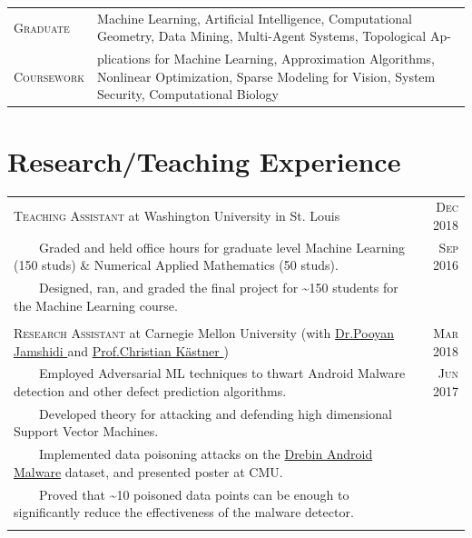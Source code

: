 \documentclass{article}
\newcommand{\tabitem}{~~\llap{\textbullet}~~}
\newcommand{\custombold}[1]{\color{subheadings}\fontspec[Path = fonts/lato/]{Lato-Reg}\selectfont #1 \normalfont}
\begin{document}
\begin{tabularx}{\textwidth}{lX}
\textsc{Graduate} & Machine Learning, Artificial Intelligence, Computational Geometry, Data Mining, Multi-Agent Systems, Topological Ap-\\
\textsc{Coursework} & plications for Machine Learning, Approximation Algorithms, Nonlinear Optimization, Sparse Modeling for Vision, System Security, Computational Biology
\end{tabularx}
\fi

\vspace{12pt}\section{Research/Teaching Experience}
\begin{tabularx}{\textwidth}{X|r}

\large{\textsc{Teaching Assistant} at \custombold{Washington University in St. Louis}} & \textsc{Dec} 2018\\
\tabitem Graded and held office hours for graduate level Machine Learning (150 studs) \& Numerical Applied Mathematics (50 studs). & \textsc{Sep} 2016\\
\tabitem Designed, ran, and graded the final project for \textasciitilde 150 students for the Machine Learning course.\\
\multicolumn{2}{c}{\vspace{-5pt}} \\

\large{\textsc{Research Assistant} at \custombold{Carnegie Mellon University}} \normalsize{(with \href{https://www.cs.cmu.edu/~pjamshid/}{Dr.\custombold{Pooyan Jamshidi}} and \href{https://www.cs.cmu.edu/~ckaestne/}{Prof.\custombold{Christian Kästner}})}& \textsc{Mar} 2018\\
\tabitem Employed Adversarial ML techniques to thwart Android Malware detection and other defect prediction algorithms. & \textsc{Jun} 2017\\
\tabitem Developed theory for attacking and defending high dimensional Support Vector Machines.\\
\tabitem Implemented data poisoning attacks on the \href{https://www.sec.cs.tu-bs.de/~danarp/drebin/}{Drebin Android Malware} dataset, and presented poster at CMU. \\
\tabitem Proved that \textasciitilde 10 poisoned data points can be enough to significantly reduce the effectiveness of the malware detector.\\
\multicolumn{2}{c}{\vspace{-5pt}} \\


\end{tabularx}
\end{document}
